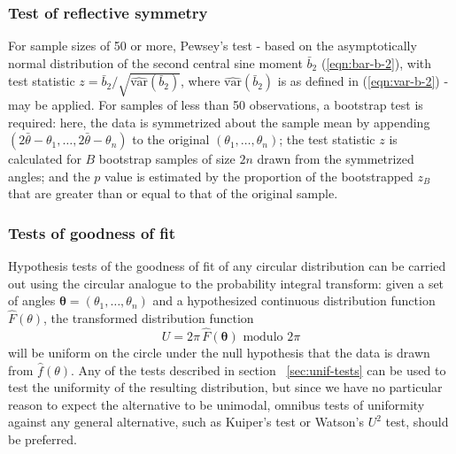 \documentclass[../../ArchStats.tex]{subfiles}
\begin{document}
\subsubsection{Test of reflective symmetry}
\label{sec:refl-symmetry}

For sample sizes of 50 or more, Pewsey's test\cite{Pewsey2002} - based on the asymptotically normal distribution of the second central sine moment $\bar{b}_2$ (\ref{eqn:bar-b-2}), with test statistic $z = \bar{b}_2 / \sqrt{\widehat{\text{var}}(\bar{b}_2)}$, where $\widehat{\text{var}}(\bar{b}_2)$ is as defined in (\ref{eqn:var-b-2}) - may be applied. For samples of less than 50 observations, a bootstrap test is required: here, the data is symmetrized about the sample mean by appending $(2\bar{\theta} - \theta_1, \dots, 2\bar{\theta} - \theta_n)$ to the original $(\theta_1, \dots, \theta_n)$; the test statistic $z$ is calculated for $B$ bootstrap samples of size $2n$ drawn from the symmetrized angles; and the $p$ value is estimated by the proportion of the bootstrapped $z_B$ that are greater than or equal to that of the original sample.

\subsubsection{Tests of goodness of fit}
\label{sec:GoF}

Hypothesis tests of the goodness of fit of any circular distribution can be carried out using the circular analogue to the probability integral transform: given a set of angles $\mathbf{\theta} = (\theta_1, \dots, \theta_n)$ and a hypothesized continuous distribution function $\hat{F}(\theta)$, the transformed distribution function
\begin{equation}
U = 2\pi \, \hat{F}(\mathbf{\theta}) \text{ modulo } 2\pi
\end{equation}
will be uniform on the circle under the null hypothesis that the data is drawn from $\hat{f}(\theta)$. Any of the tests described in section ~\ref{sec:unif-tests} can be used to test the uniformity of the resulting distribution, but since we have no particular reason to expect the alternative to be unimodal, omnibus tests of uniformity against any general alternative, such as Kuiper's test or Watson's $U^2$ test, should be preferred.
\end{document}
